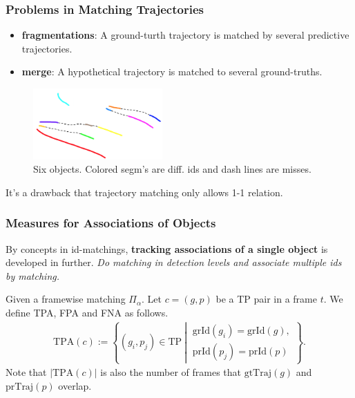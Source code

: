 \documentclass[slidetop, mathserif]{beamer}
\begin{document}
\begin{frame}
	\frametitle{Problems in Matching Trajectories}
			
	\begin{itemize}
		\item {\bf fragmentations}:
		      A ground-turth trajectory is matched by
		      several predictive trajectories.
		\item {\bf merge}:
		      A hypothetical trajectory is matched to several ground-truths.
	\end{itemize}
	
	\vspace{-15pt}
	\begin{figure}
		\includegraphics[width=140pt]{pics/fig9.png}
		\caption{Six objects. Colored segm's are diff. ids and dash lines are misses.}
	\end{figure}
		
	\vspace{-15pt}
	It's a drawback that trajectory matching only allows 1-1 relation.
			
\end{frame}

\begin{frame}
	\frametitle{Measures for Associations of Objects}
			
	By concepts in id-matchings,
	{\bf tracking associations of a single object} is developed in further.
	\emph{Do matching in detection levels and associate multiple ids by matching.}
			
	\vspace{5pt}
			
	Given a framewise matching $\Pi_\alpha$.
	Let $c = (g,p)$ be a TP pair in a frame $t$.
	We define TPA, FPA and FNA as follows.
	\begin{align*}
		\text{TPA}(c) :=                       
		\left\{(g_i, p_j)\in\text{TP}\ \left|\ 
		\begin{array}{c}                       
		\text{grId}(g_i)=\text{grId}(g),       \\
		\text{prId}(p_j) = \text{prId}(p)      
		\end{array}\right.                     
		\right\}.                              
	\end{align*}
	Note that $|\text{TPA}(c)|$ is also the number of frames that $\text{gtTraj}(g)$
	and $\text{prTraj}(p)$ overlap.
			
\end{frame}
\end{document}
